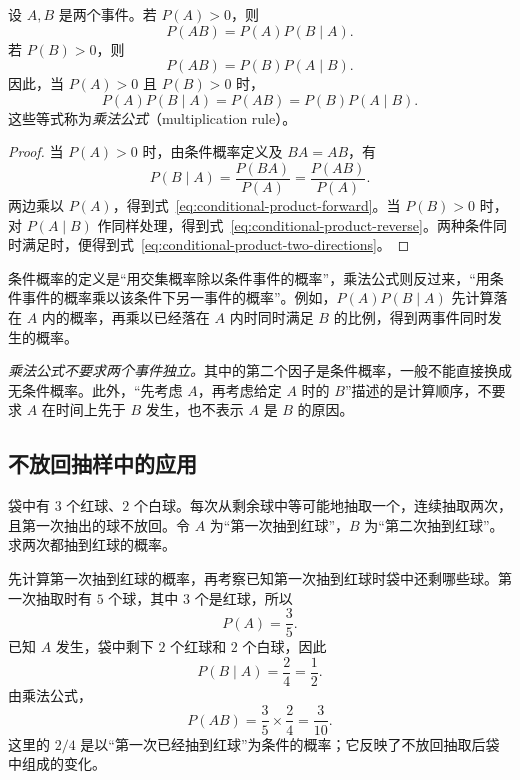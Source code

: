 \documentclass[UTF8,12pt,a4paper,fontset=fandol]{ctexart}
\begin{document}
\begin{theorem}[乘法公式]
\label{thm:conditional-product-rule}
设 $A,B$ 是两个事件。若 $P(A)>0$，则
\begin{equation}
  P(AB)=P(A)P(B\mid A).
  \label{eq:conditional-product-forward}
\end{equation}
若 $P(B)>0$，则
\begin{equation}
  P(AB)=P(B)P(A\mid B).
  \label{eq:conditional-product-reverse}
\end{equation}
因此，当 $P(A)>0$ 且 $P(B)>0$ 时，
\begin{equation}
  P(A)P(B\mid A)=P(AB)=P(B)P(A\mid B).
  \label{eq:conditional-product-two-directions}
\end{equation}
这些等式称为\emph{乘法公式}（multiplication rule）。
\end{theorem}
\begin{proof}
当 $P(A)>0$ 时，由条件概率定义及 $BA=AB$，有
\[
  P(B\mid A)=\frac{P(BA)}{P(A)}=\frac{P(AB)}{P(A)}.
\]
两边乘以 $P(A)$，得到式~\eqref{eq:conditional-product-forward}。当 $P(B)>0$ 时，对 $P(A\mid B)$ 作同样处理，得到式~\eqref{eq:conditional-product-reverse}。两种条件同时满足时，便得到式~\eqref{eq:conditional-product-two-directions}。
\end{proof}

条件概率的定义是“用交集概率除以条件事件的概率”，乘法公式则反过来，“用条件事件的概率乘以该条件下另一事件的概率”。例如，$P(A)P(B\mid A)$ 先计算落在 $A$ 内的概率，再乘以已经落在 $A$ 内时同时满足 $B$ 的比例，得到两事件同时发生的概率。

\emph{乘法公式不要求两个事件独立。}其中的第二个因子是条件概率，一般不能直接换成无条件概率。此外，“先考虑 $A$，再考虑给定 $A$ 时的 $B$”描述的是计算顺序，不要求 $A$ 在时间上先于 $B$ 发生，也不表示 $A$ 是 $B$ 的原因。

\subsection{不放回抽样中的应用}

\begin{example}[连续两次抽到红球]
\label{ex:conditional-product-balls}
袋中有 $3$ 个红球、$2$ 个白球。每次从剩余球中等可能地抽取一个，连续抽取两次，且第一次抽出的球不放回。令 $A$ 为“第一次抽到红球”，$B$ 为“第二次抽到红球”。求两次都抽到红球的概率。
\end{example}
\begin{solve}
先计算第一次抽到红球的概率，再考察已知第一次抽到红球时袋中还剩哪些球。第一次抽取时有 $5$ 个球，其中 $3$ 个是红球，所以
\[
  P(A)=\frac35.
\]
已知 $A$ 发生，袋中剩下 $2$ 个红球和 $2$ 个白球，因此
\[
  P(B\mid A)=\frac24=\frac12.
\]
由乘法公式，
\begin{equation}
  P(AB)=\frac35\times\frac24=\frac3{10}.
  \label{eq:conditional-product-balls}
\end{equation}
这里的 $2/4$ 是以“第一次已经抽到红球”为条件的概率；它反映了不放回抽取后袋中组成的变化。
\end{solve}
\end{document}
